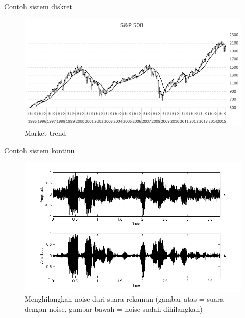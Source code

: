 \documentclass[aspectratio=169]{beamer}
\begin{document}
\begin{frame}{Contoh sistem diskret}
	\begin{figure}
		\centering
		\includegraphics[height=0.7\textheight]{gambar/00.pengantar/00.proses_sinyal_diskret}
		\caption{Market trend}
	\end{figure}
\end{frame}

\begin{frame}{Contoh sistem kontinu}
	\begin{figure}
		\centering
		\includegraphics[height=0.7\textheight]{gambar/00.pengantar/00.proses_sinyal_kontinu}
		\caption{Menghilangkan noise dari suara rekaman (gambar atas = suara dengan noise, gambar bawah = noise sudah dihilangkan)}
	\end{figure}
\end{frame}
\end{document}
